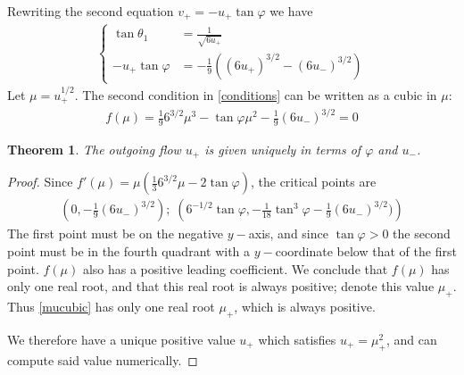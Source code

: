 \documentclass[12pt]{article}
\newtheorem{theorem}{Theorem}
\numberwithin{equation}{section}
\begin{document}
Rewriting the second equation $v_+ = -u_+\tan \varphi$ we have 
\begin{align}
    \left\{
\begin{array}{rl}
     \tan \theta_1 &= \frac{1}{\sqrt{6u_+}} \\
     -u_+ \tan\varphi &= -\frac{1}{9}\left((6u_+)^{3/2}-(6u_-)^{3/2}\right)
     \label{conditions}
\end{array}
\right.
\end{align}
Let $\mu  =u_+^{1/2}$. The second condition in \ref{conditions}  can be written as a cubic in $\mu$:
\begin{align}
    f(\mu)=\frac{1}{9}6^{3/2}\mu^3 - \tan \varphi \mu^2 - \frac{1}{9}(6u_-)^{3/2} \label{mucubic} = 0
\end{align}

\begin{theorem}
    The outgoing flow $u_+$ is given uniquely in terms of $\varphi$ and $u_-$.
\end{theorem}
\begin{proof}
    Since $f'(\mu)=\mu(\frac{1}{3}6^{3/2}\mu-2\tan \varphi)$, the critical points are 
\begin{align}
\left(0,-\frac{1}{9}(6u_-)^{3/2}\right); \; \left(6^{-1/2}\tan \varphi, -\frac{1}{18}\tan^3\varphi-\frac{1}{9}(6u_-)^{3/2})\right)
\end{align}
The first point must be on the negative $y-$axis, and since $\tan\varphi>0$ the second point must be in the fourth quadrant with a $y-$coordinate below that of the first point. $f(\mu)$ also has a positive leading coefficient. We conclude that $f(\mu)$ has only one real root, and that this real root is always positive; denote this value $\mu_+$. Thus \eqref{mucubic} has only one real root $\mu_+$, which is always positive.


We therefore have a unique positive value $u_+$ which satisfies $u_+=\mu_+^2$, and can compute said value numerically.
\end{proof}
\end{document}

